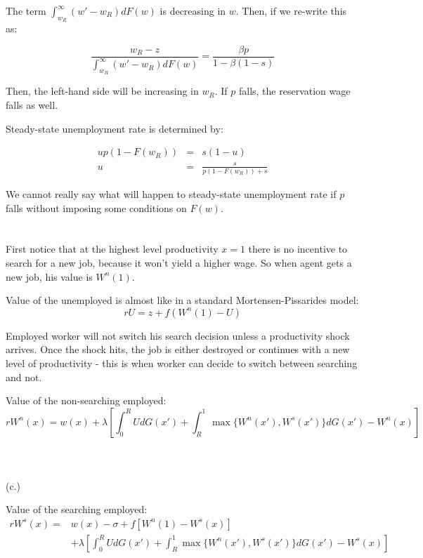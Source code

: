 \documentclass{article}
\begin{document}
\begin{enumerate}[(a)]
The term $\int_{w_R}^{\infty}(w'-w_R)dF(w)$ is decreasing in $w$. Then, if we re-write this as:

\begin{equation}
\frac{w_R - z}{\int_{w_R}^{\infty}(w'-w_R)dF(w)}=\frac{\beta p}{1-\beta(1-s)} \nonumber
\end{equation}

Then, the left-hand side will be increasing in $w_R$. If $p$ falls, the reservation wage falls as well. 

Steady-state unemployment rate is determined by:

\begin{eqnarray}
up(1-F(w_R)) &=& s(1-u) \nonumber\\
u &=& \frac{{s}}{p(1-F(w_R))+s}
\end{eqnarray}

We cannot really say what will happen to steady-state unemployment rate if $p$ falls without imposing some conditions on $F(w)$.


\end{enumerate}


\section{}

First notice that at the highest level productivity $x=1$ there is no
incentive to search for a new job, because it won't yield a higher
wage. So when agent gets a new job, his value is $W^n(1)$.

Value of the unemployed is almost like in a standard
Mortensen-Pissarides model:
\begin{equation*}
  rU=z+f(W^n(1)-U)
\end{equation*}

Employed worker will not switch his search decision unless a
productivity shock arrives. Once the shock hits, the job is either
destroyed or continues with a new level of productivity - this is when
worker can decide to switch between searching and not.

Value of the non-searching employed:
\begin{equation*}
  rW^n(x)=w(x)+\lambda\left[\int_0^RUdG(x') + \int_R^1\max\{W^n(x'),W^s(x')\}dG(x') - W^n(x)\right]
\end{equation*}\\
\\
\\
(c.) 

Value of the searching employed:
\begin{align*}
  rW^s(x)= & w(x)-\sigma+f\left[W^n(1)-W^s(x)\right] \\
           & +\lambda\left[\int_0^RUdG(x') + \int_R^1\max\{W^n(x'),W^s(x')\}dG(x') - W^s(x)\right]
\end{align*}
\end{document}
